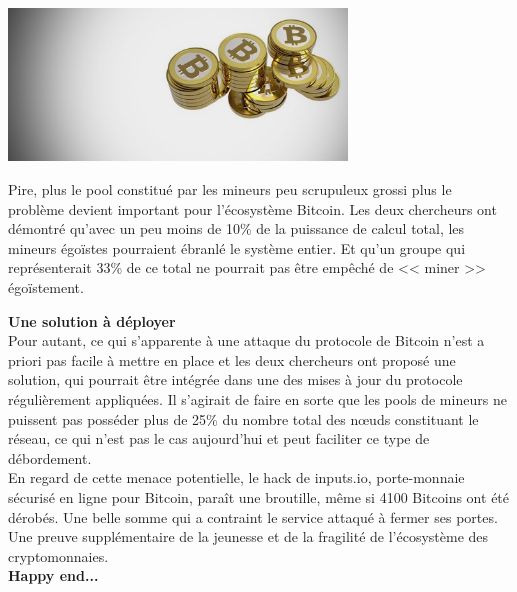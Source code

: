 \documentclass[11pt,twoside,a4paper]{article}
\begin{document}
\begin{minipage}[ht]{9.25cm}
	\includegraphics[width=9.00cm]{img/815664.jpg}~\\
\end{minipage} \hfill \begin{minipage}[ht]{10.00cm}
	Pire, plus le pool constitu{\'e} par les mineurs peu scrupuleux grossi plus le probl{\`e}me devient important pour l'{\'e}cosyst{\`e}me Bitcoin. Les deux chercheurs ont d{\'e}montr{\'e} qu'avec un peu moins de 10\% de la puissance de calcul total, les mineurs {\'e}go{\"i}stes pourraient {\'e}branl{\'e} le syst{\`e}me entier. Et qu'un groupe qui repr{\'e}senterait 33\% de ce total ne pourrait pas {\^e}tre emp{\^e}ch{\'e} de << miner >> {\'e}go{\"i}stement. ~\\
\end{minipage}

\textbf{Une solution {\`a} d{\'e}ployer} ~\\

Pour autant, ce qui s'apparente {\`a} une attaque du protocole de Bitcoin n'est a priori pas facile {\`a} mettre en place et les deux chercheurs ont propos{\'e} une solution, qui pourrait {\^e}tre int{\'e}gr{\'e}e dans une des mises {\`a} jour du protocole r{\'e}guli{\`e}rement appliqu{\'e}es. Il s'agirait de faire en sorte que les pools de mineurs ne puissent pas poss{\'e}der plus de 25\% du nombre total des n\oe uds constituant le r{\'e}seau, ce qui n'est pas le cas aujourd'hui et peut faciliter ce type de d{\'e}bordement. ~\\

En regard de cette menace potentielle, le hack de inputs.io, porte-monnaie s{\'e}curis{\'e} en ligne pour Bitcoin, para{\^i}t une broutille, m{\^e}me si 4100 Bitcoins ont {\'e}t{\'e} d{\'e}rob{\'e}s. Une belle somme qui a contraint le service attaqu{\'e} {\`a} fermer ses portes. Une preuve suppl{\'e}mentaire de la jeunesse et de la fragilit{\'e} de l'{\'e}cosyst{\`e}me des cryptomonnaies. ~\\

\textbf{Happy end...} ~\\
\end{document}
